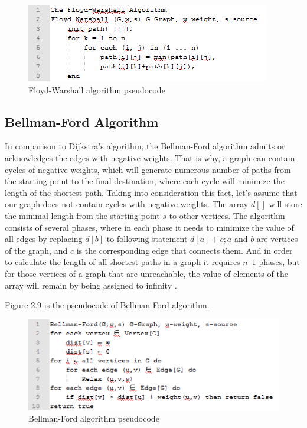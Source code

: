 \begin{figure}[h!]
	\centering
	\includegraphics[scale=1]{figure7.png}
	\caption{Floyd-Warshall algorithm pseudocode}
	\label{fig:figure7}
\end{figure}
\vspace{40mm}
\subsection{Bellman-Ford Algorithm}
In comparison to Dijkstra’s algorithm, the Bellman-Ford algorithm admits or acknowledges the edges with negative weights. That is why, a graph can contain cycles of negative weights, which will generate numerous number of paths from the starting point to the final destination, where each cycle will minimize the length of the shortest path. Taking into consideration this fact, let’s assume that our graph does not contain cycles with negative weights. The array $d[]$ will store the minimal length from the starting point $s$ to other vertices. The algorithm consists of several phases, where in each phase it needs to minimize the value of all edges by replacing $d[b]$ to following statement $d[a] + c; a$ and $b$ are vertices of the graph, and $c$ is the corresponding edge that connects them. And in order to calculate the length of all shortest paths in a graph it requires $n – 1$ phases, but for those vertices of a graph that are unreachable, the value of elements of the array will remain by being assigned to infinity \cite{magzhan2013review}.

Figure 2.9 is the pseudocode of Bellman-Ford algorithm.
 
\begin{figure}[h!]
	\centering
	\includegraphics[scale=1]{figure8.png}
	\caption{Bellman-Ford algorithm pseudocode}
	\label{fig:figure8}
\end{figure}


